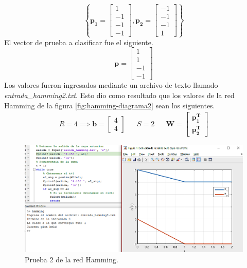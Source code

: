 \documentclass[12pt, titlepage]{article}
\begin{document}
    \[ \left\lbrace \boldsymbol{p_1} = \left[\begin{array}{c}1\\ -1\\ -1 \\ -1 \end{array}\right], \boldsymbol{p_2} = \left[\begin{array}{c}-1\\ -1\\ -1 \\ 1 \end{array}\right] \right\rbrace \]
    El vector de prueba a clasificar fue el siguiente.
    \[ \boldsymbol{p} = \left[\begin{array}{c}1\\ 1\\ -1 \\ -1\end{array}\right] \]
    Los valores fueron ingresados mediante un archivo de texto llamado \emph{entrada\_hamming2.txt}. Esto dio como resultado que los valores de la red Hamming de la figura \ref{fig:hamming-diagrama2} sean los siguientes.
    \begin{align*}
    R = 4 \implies \boldsymbol{b} = \left[\begin{array}{c}4 \\4\end{array}\right] && S = 2 && \boldsymbol{W} = \left[\begin{array}{c}\boldsymbol{p^{T}_1}\\ \boldsymbol{p^{T}_2}\end{array}\right]
    \end{align*}
    \begin{figure}[H]
        \begin{center}
            \includegraphics[width=16cm]{img/hamming/hamming2.png}
            \caption{Prueba 2 de la red Hamming.}
            \label{fig:hamming2}
        \end{center}
    \end{figure}
\end{document}
